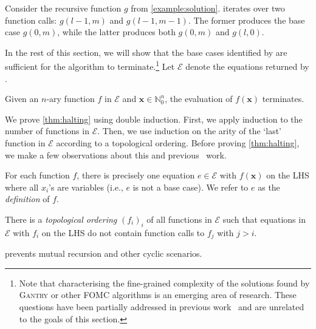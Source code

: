 \documentclass[a4paper,UKenglish,cleveref,autoref,thm-restate]{lipics-v2021}
\newcommand{\Cranetwo}{\textsc{Gantry}}
\begin{document}
\begin{example}
  Consider the recursive function $g$ from \cref{example:solution}.
  \FindBaseCases iterates over two function calls: $g(l-1, m)$ and
  $g(l-1, m-1)$. The former produces the base case $g(0, m)$, while the latter
  produces both $g(0, m)$ and $g(l, 0)$.
\end{example}

In the rest of this section, we will show that the base cases identified by
\FindBaseCases are sufficient for the algorithm to terminate.\footnote{Note that
  characterising the fine-grained complexity of the solutions found by
  \Cranetwo{} or other FOMC algorithms is an emerging area of research. These
  questions have been partially addressed in previous
  work~\cite{DBLP:conf/kr/DilkasB23,DBLP:conf/kr/TothK24} and are unrelated to
  the goals of this section.} Let $\mathcal{E}$ denote the equations returned by
\CompileWithBaseCases.

\begin{theorem}\label{thm:halting}
  Given an $n$-ary function $f$ in $\mathcal{E}$ and
  $\mathbf{x} \in \mathbb{N}_{0}^{n}$, the evaluation of $f(\mathbf{x})$
  terminates.
\end{theorem}

We prove \cref{thm:halting} using double induction. First, we apply induction to
the number of functions in $\mathcal{E}$. Then, we use induction on the arity of
the `last' function in $\mathcal{E}$ according to a topological ordering. Before
proving \cref{thm:halting}, we make a few observations about this and
previous~\cite{DBLP:conf/kr/DilkasB23,DBLP:conf/ijcai/BroeckTMDR11} work.

\begin{observation}\label{assumption1}
  For each function $f$, there is precisely one equation $e \in \mathcal{E}$
  with $f(\mathbf{x})$ on the LHS where all $x_{i}$'s are variables (i.e., $e$
  is not a base case). We refer to $e$ as the \emph{definition} of $f$.
\end{observation}

\begin{observation}\label{assumption2}
  There is a \emph{topological ordering} ${(f_{i})}_{i}$ of all functions in
  $\mathcal{E}$ such that equations in $\mathcal{E}$ with $f_{i}$ on the LHS do
  not contain function calls to $f_{j}$ with $j > i$.
\end{observation}

 prevents mutual recursion and other cyclic scenarios.
\end{document}
